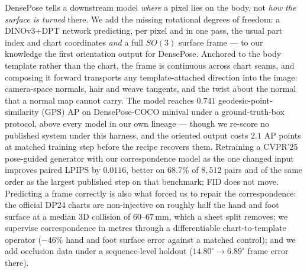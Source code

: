 DensePose tells a downstream model \emph{where} a pixel lies on the body, not
\emph{how the surface is turned} there. We add the missing rotational degrees of
freedom: a DINOv3+DPT network predicting, per pixel and in one pass, the usual part
index and chart coordinates \emph{and} a full $SO(3)$ surface frame --- to our
knowledge the first orientation output for DensePose. Anchored to the body template
rather than the chart, the frame is continuous across chart seams, and composing it
forward transports any template-attached direction into the image: camera-space
normals, hair and weave tangents, and the twist about the normal that a normal map
cannot carry. The model reaches $0.741$ geodesic-point-similarity (GPS) AP on
DensePose-COCO minival under a ground-truth-box protocol, above every model in our own
lineage --- though we re-score no published system under this harness, and the oriented
output costs $2.1$ AP points at matched training step before the recipe recovers them.
Retraining a CVPR'25 pose-guided generator with our correspondence model as the one
changed input improves paired LPIPS by $0.0116$, better on $68.7\%$ of $8{,}512$ pairs
and of the same order as the largest published step on that benchmark; FID does not
move. Predicting a frame correctly is also what forced us to repair the correspondence:
the official DP24 charts are non-injective on roughly half the hand and foot surface at
a median $3$D collision of $60$--$67$\,mm, which a sheet split removes; we supervise
correspondence in metres through a differentiable chart-to-template operator ($-46\%$
hand and foot surface error against a matched control); and we add occlusion data under
a sequence-level holdout ($14.80^\circ\!\rightarrow\!6.89^\circ$ frame error there).
